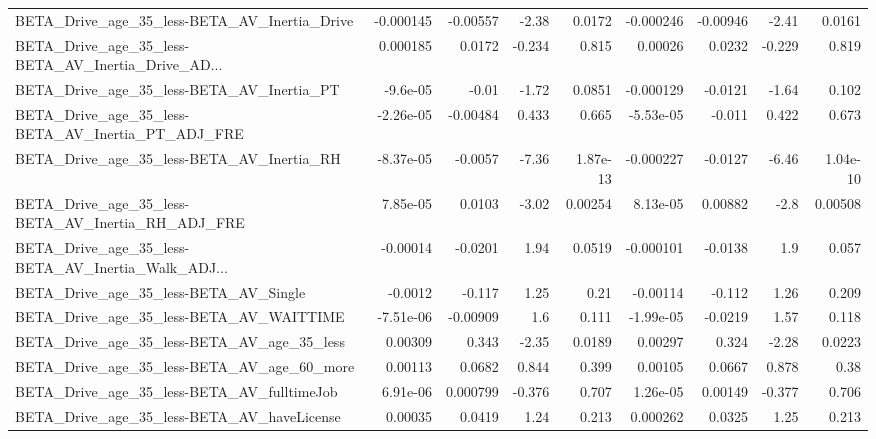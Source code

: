 \begin{tabular}{lrrrrrrrr}
BETA\_Drive\_age\_35\_less-BETA\_AV\_Inertia\_Drive       &   -0.000145 &     -0.00557 &    -2.38 &   0.0172 &  -0.000246 &    -0.00946 &        -2.41 &        0.0161 \\
BETA\_Drive\_age\_35\_less-BETA\_AV\_Inertia\_Drive\_AD... &    0.000185 &       0.0172 &   -0.234 &    0.815 &    0.00026 &      0.0232 &       -0.229 &         0.819 \\
BETA\_Drive\_age\_35\_less-BETA\_AV\_Inertia\_PT          &    -9.6e-05 &        -0.01 &    -1.72 &   0.0851 &  -0.000129 &     -0.0121 &        -1.64 &         0.102 \\
BETA\_Drive\_age\_35\_less-BETA\_AV\_Inertia\_PT\_ADJ\_FRE  &   -2.26e-05 &     -0.00484 &    0.433 &    0.665 &  -5.53e-05 &      -0.011 &        0.422 &         0.673 \\
BETA\_Drive\_age\_35\_less-BETA\_AV\_Inertia\_RH          &   -8.37e-05 &      -0.0057 &    -7.36 & 1.87e-13 &  -0.000227 &     -0.0127 &        -6.46 &      1.04e-10 \\
BETA\_Drive\_age\_35\_less-BETA\_AV\_Inertia\_RH\_ADJ\_FRE  &    7.85e-05 &       0.0103 &    -3.02 &  0.00254 &   8.13e-05 &     0.00882 &         -2.8 &       0.00508 \\
BETA\_Drive\_age\_35\_less-BETA\_AV\_Inertia\_Walk\_ADJ... &    -0.00014 &      -0.0201 &     1.94 &   0.0519 &  -0.000101 &     -0.0138 &          1.9 &         0.057 \\
BETA\_Drive\_age\_35\_less-BETA\_AV\_Single              &     -0.0012 &       -0.117 &     1.25 &     0.21 &   -0.00114 &      -0.112 &         1.26 &         0.209 \\
BETA\_Drive\_age\_35\_less-BETA\_AV\_WAITTIME            &   -7.51e-06 &     -0.00909 &      1.6 &    0.111 &  -1.99e-05 &     -0.0219 &         1.57 &         0.118 \\
BETA\_Drive\_age\_35\_less-BETA\_AV\_age\_35\_less         &     0.00309 &        0.343 &    -2.35 &   0.0189 &    0.00297 &       0.324 &        -2.28 &        0.0223 \\
BETA\_Drive\_age\_35\_less-BETA\_AV\_age\_60\_more         &     0.00113 &       0.0682 &    0.844 &    0.399 &    0.00105 &      0.0667 &        0.878 &          0.38 \\
BETA\_Drive\_age\_35\_less-BETA\_AV\_fulltimeJob         &    6.91e-06 &     0.000799 &   -0.376 &    0.707 &   1.26e-05 &     0.00149 &       -0.377 &         0.706 \\
BETA\_Drive\_age\_35\_less-BETA\_AV\_haveLicense         &     0.00035 &       0.0419 &     1.24 &    0.213 &   0.000262 &      0.0325 &         1.25 &         0.213 \\

\end{tabular}
